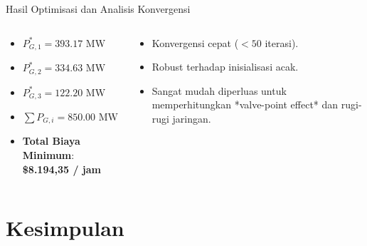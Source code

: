 \documentclass[10pt,aspectratio=169]{beamer}
\begin{document}
\begin{frame}{Hasil Optimisasi dan Analisis Konvergensi}
    \begin{columns}
        \begin{tcolorbox}[colback=white,colframe=unibblue,title=\textbf{Hasil Solusi PSO}]
            \begin{itemize}
                \item $P_{G,1}^* = 393.17\text{ MW}$
                \item $P_{G,2}^* = 334.63\text{ MW}$
                \item $P_{G,3}^* = 122.20\text{ MW}$
                \item $\sum P_{G,i} = 850.00\text{ MW}$
                \item \textbf{Total Biaya Minimum}: \textbf{\$8.194,35 / jam}
            \end{itemize}
        \end{tcolorbox}

        \begin{tcolorbox}[colback=white,colframe=darkgreen,title=\textbf{Keunggulan PSO dalam ED}]
            \begin{itemize}
                \item Konvergensi cepat ($< 50$ iterasi).
                \item Robust terhadap inisialisasi acak.
                \item Sangat mudah diperluas untuk memperhitungkan *valve-point effect* dan rugi-rugi jaringan.
            \end{itemize}
        \end{tcolorbox}
    \end{columns}
\end{frame}

\section{Kesimpulan}
\end{document}
